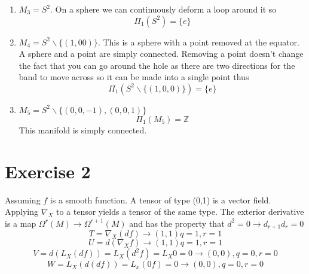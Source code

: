 \documentclass[12pt]{article}
\begin{document}
\begin{enumerate}
  \item $M_3 = S^2$. On a sphere we can continuously deform a loop around it so 
  $$ \Pi_1 (S^2) = \{ e \} $$ 
  
  \item $M_4 = S^2 \backslash \{ (1,00) \} $. This is a sphere with a point removed at the equator. A sphere and a point are simply connected. 
  Removing a point doesn't change the fact that you can go around the hole as there are two directions for the band to move across so it can be made into a single point thus 
  $$ \Pi_1 (S^2 \backslash \{ (1,0,0) \} ) = \{ e \} $$

  \item $M_5 = S^2 \backslash \{ (0,0,-1), (0,0,1) \} $
  $$ \Pi_1 (M_5) = \mathbb{Z} $$
  This manifold is simply connected. 
\end{enumerate}


\section*{Exercise 2}
Assuming $f$ is a smooth function. A tensor of type (0,1) is a vector field. Applying $\nabla_X$ to a tensor yields a tensor of the same type. The exterior derivative is a map $\Omega^r (M) \rightarrow \Omega^{r+1} (M)$ and has the property that $d^2 =0 \rightarrow d_{r+1} d_r = 0 $
$$ T = \nabla_X (df) \rightarrow (1,1) q=1, r=1 $$
$$ U = d( \nabla_X f) \rightarrow (1,1) q=1, r=1 $$
$$ V = d( L_X (df)) = L_X (d^2 f) = L_X 0 = 0 \rightarrow (0,0), q=0, r=0 $$
$$ W = L_X (d(df)) = L_x (0f) = 0 \rightarrow (0,0), q=0, r=0 $$
\end{document}
